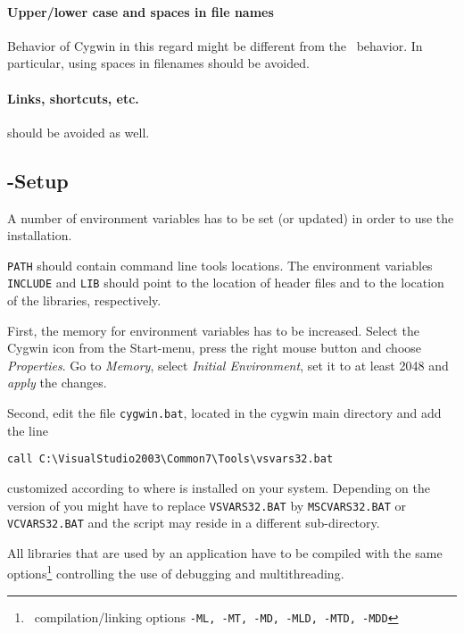 \paragraph{Upper/lower case and spaces in file names}
Behavior of Cygwin in this regard might be different from the \mswin\
behavior. In particular, using spaces in filenames should be avoided.

\paragraph{Links, shortcuts, etc.} should be avoided as well.

\subsection{\msvc{}-Setup}

A number of environment variables has to be set (or updated)
in order to use the installation.

\texttt{PATH} should contain \msvc{} command line tools locations.
The environment variables \texttt{INCLUDE} and \texttt{LIB} should
point to the location of \msvc{} header files and to the location of
the \msvc{} libraries, respectively.

First, the memory for environment variables has to be increased.
Select the Cygwin icon from the Start-menu, press the right mouse
button and choose \textit{Properties}. Go to \textit{Memory}, select
\textit{Initial Environment}, set it to at least 2048 and
\textit{apply} the changes.

Second, edit the file \texttt{cygwin.bat}, located in the cygwin main
directory and add the line
\begin{verbatim}
call C:\VisualStudio2003\Common7\Tools\vsvars32.bat
\end{verbatim}
customized according to where \msvc{} is installed on your system.
Depending on the version of \msvc{} you might have to replace
\texttt{VSVARS32.BAT} by \texttt{MSCVARS32.BAT} or
\texttt{VCVARS32.BAT} and the script may reside in a different
sub-directory.

All libraries that are used by an application have to be compiled with
the same options\footnote{\msvc\ compilation/linking options
  \texttt{-ML, -MT, -MD, -MLD, -MTD, -MDD}} controlling the use of
debugging and multithreading.



